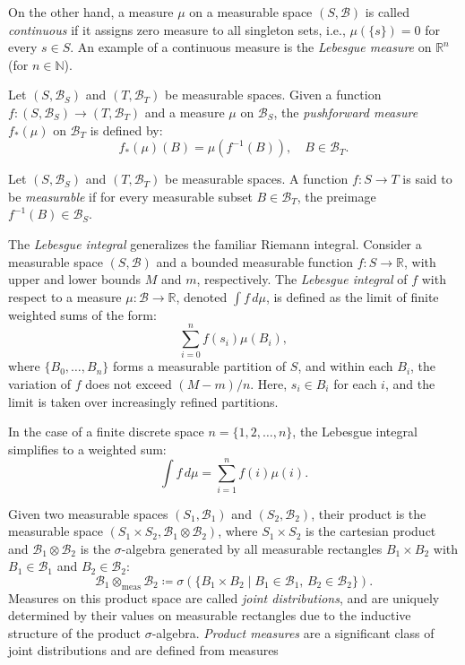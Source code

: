 On the other hand, a measure $ \mu $ on a measurable space $ (S, \mathcal{B}) $ is called \emph{continuous} if it assigns zero measure to all singleton sets, i.e., $ \mu(\{s\}) = 0 $ for every $ s \in S $. An example of a continuous measure is the \emph{Lebesgue measure} on $ \mathbb{R}^n $ (for $ n \in \mathbb{N} $).



\begin{definition} \label{def:pushforward_meas_1}
  Let $(S, \mathcal{B}_S)$ and $(T, \mathcal{B}_T)$ be measurable spaces. Given a function $f: (S, \mathcal{B}_S) \to (T, \mathcal{B}_T)$ and a measure $\mu$ on $\mathcal{B}_S$, the \emph{pushforward measure} $f_*(\mu)$ on $\mathcal{B}_T$ is defined by:
$$
f_*(\mu)(B) = \mu(f^{-1}(B)), \quad  B \in \mathcal{B}_T.
$$
\end{definition}



\begin{definition}
  Let $(S, \mathcal{B}_S)$ and $(T, \mathcal{B}_T)$ be measurable spaces. A function $f: S \to T$ is said to be \emph{measurable} if for every  measurable subset  $B \in \mathcal{B}_T$, the preimage $f^{-1}(B) \in \mathcal{B}_S$.
\end{definition}


\begin{definition} 
  The \emph{Lebesgue integral} generalizes the familiar Riemann integral. Consider a measurable space $(S, \mathcal{B})$ and a bounded measurable function $f \colon S \to \mathbb{R}$, with upper and lower bounds $M$ and $m$, respectively. The \emph{Lebesgue integral} of $f$ with respect to a measure $\mu \colon \mathcal{B} \to \mathbb{R}$, denoted $\int f \, d\mu$, is defined as the limit of finite weighted sums of the form:
$$
\sum_{i=0}^n f(s_i) \mu(B_i),
$$
where $\{B_0, \dots, B_n\}$ forms a measurable partition of $S$, and within each $B_i$, the variation of $f$ does not exceed $(M - m)/n$. Here, $s_i \in B_i$ for each $i$, and the limit is taken over increasingly refined partitions. 
\end{definition}


In the case of a finite discrete space $n = \{1, 2, \dots, n\}$, the Lebesgue integral simplifies to a weighted sum:
$$
\int f \, d\mu = \sum_{i=1}^n f(i) \mu(i).
$$

Given two measurable spaces $(S_1, \mathcal{B}_1)$ and $(S_2, \mathcal{B}_2)$, their product is the measurable space $(S_1 \times S_2, \mathcal{B}_1 \otimes \mathcal{B}_2)$, where $S_1  \times S_2$ is the cartesian product and $\mathcal{B}_1 \otimes \mathcal{B}_2$ is the $\sigma$-algebra generated by all measurable rectangles $B_1 \times B_2$ with $B_1 \in \mathcal{B}_1$ and $B_2 \in \mathcal{B}_2$:
$$
\mathcal{B}_1 \otimes_{\text{meas}} \mathcal{B}_2 \coloneqq \sigma\left(\{ B_1 \times B_2 \mid B_1 \in \mathcal{B}_1,\, B_2 \in \mathcal{B}_2 \}\right).
$$
Measures on this product space are called \emph{joint distributions}, and are uniquely determined by their values on measurable rectangles due to the inductive structure of the product $\sigma$-algebra. \emph{Product measures} are a significant class of joint distributions and are defined from measures

